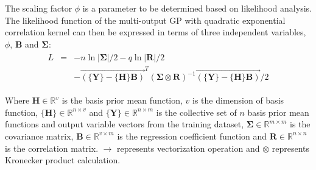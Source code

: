 \documentclass[12pt]{extbook}
\begin{document}
The scaling factor $\phi$ is a parameter to be determined based on likelihood analysis.\\ 

The likelihood function of the multi-output GP with quadratic exponential correlation kernel can then be expressed in terms of three independent variables, $\phi$, $\bm{B}$ and $\bm{\Sigma}$:
\begin{equation}
\begin{split}
\begin{array}{lll}
L & = & - n\ln|\bm{\Sigma}| / 2 - q\ln|\bm{R}| / 2\\
& & - \overrightarrow{(\{\bm{Y}\}-\{\bm{H}\}\bm{B})}^T(\bm{\Sigma}\otimes\bm{R})^{-1}\overrightarrow{(\{\bm{Y}\}-\{\bm{H}\}\bm{B})} / 2
\end{array}
\end{split}
\label{2-1-8}
\end{equation}

Where $\bm{H}\in \mathbb{R}^{v}$ is the basis prior mean function, $v$ is the dimension of basis function, $\{\bm{H}\}\in \mathbb{R}^{n \times v}$ and $\{\bm{Y}\}\in \mathbb{R}^{n \times m}$ is the collective set of $n$ basis prior mean functions and output variable vectors from the training dataset, $\bm{\Sigma}\in \mathbb{R}^{m\times m}$ is the covariance matrix, $\bm{B}\in \mathbb{R}^{v\times m}$ is the regression coefficient function and $\bm{R}\in\mathbb{R}^{n\times n}$ is the correlation matrix. $\rightarrow$ represents vectorization operation and $\otimes$ represents Kronecker product calculation.\\
\end{document}

